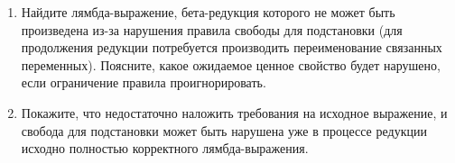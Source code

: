 \documentclass[10pt,a4paper,oneside]{article}
\begin{document}
\begin{enumerate}
\begin{enumerate}
\item Найдите лямбда-выражение, бета-редукция которого не может быть произведена из-за нарушения
правила свободы для подстановки (для продолжения редукции потребуется производить переименование
связанных переменных). Поясните, какое ожидаемое ценное свойство будет нарушено, если ограничение
правила проигнорировать.
\item Покажите, что недостаточно наложить требования на исходное выражение, и свобода для подстановки
может быть нарушена уже в процессе редукции исходно полностью корректного лямбда-выражения.
\end{enumerate}

%
%


\end{enumerate}
\end{document}

